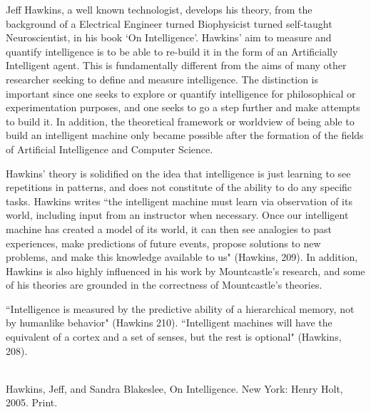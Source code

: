 \documentclass[11pt, oneside]{article}
\begin{document}

\par Jeff Hawkins, a well known technologist, develops his theory, from the background of a Electrical Engineer turned Biophysicist turned self-taught Neuroscientist, in his book `On Intelligence'. Hawkins' aim to measure and quantify intelligence is to be able to re-build it in the form of an Artificially Intelligent agent. This is fundamentally different from the aims of many other researcher seeking to define and measure intelligence. The distinction is important since one seeks to explore or quantify intelligence for philosophical or experimentation purposes, and one seeks to go a step further and make attempts to build it. In addition, the theoretical framework or worldview of being able to build an intelligent machine only became possible after the formation of the fields of Artificial Intelligence and Computer Science.

\par Hawkins' theory is solidified on the idea that intelligence is just learning to see repetitions in patterns, and does not constitute of the ability to do any specific tasks. Hawkins writes ``the intelligent machine must learn via observation of its world, including input from an instructor when necessary. Once our intelligent machine has created a model of its world, it can then see analogies to past experiences, make predictions of future events, propose solutions to new problems, and make this knowledge available to us" (Hawkins, 209). In addition, Hawkins is also highly influenced in his work by Mountcastle's research, and some of his theories are grounded in the correctness of Mountcastle's theories.

\par ``Intelligence is measured by the predictive ability of a hierarchical memory, not by humanlike behavior" (Hawkins 210). ``Intelligent machines will have the equivalent of a cortex and a set of senses, but the rest is optional" (Hawkins, 208). 

\noindent 

\begin{workscited}
\bibent \\
\bibent Hawkins, Jeff, and Sandra Blakeslee, On Intelligence. New York: Henry Holt, 2005.
Print. \\
\end{workscited}
\end{document}
